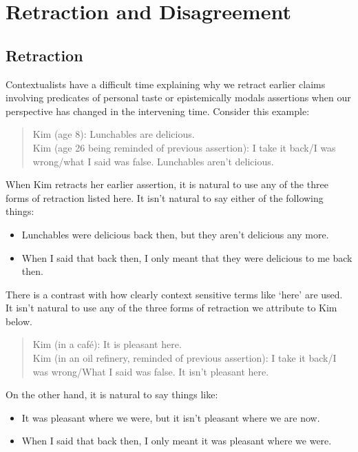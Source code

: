\documentclass[
  10pt,
  letterpaper,
  DIV=11,
  numbers=noendperiod,
  twoside]{scrartcl}
\providecommand{\tightlist}{%
  \setlength{\itemsep}{0pt}\setlength{\parskip}{0pt}}\usepackage{longtable,booktabs,array}
\begin{document}
\section{Retraction and Disagreement}\label{retractionanddisagreement}

\subsection{Retraction}\label{retraction}

Contextualists have a difficult time explaining why we retract earlier
claims involving predicates of personal taste or epistemically modals
assertions when our perspective has changed in the intervening time.
Consider this example:

\begin{quote}
Kim (age 8): Lunchables are delicious.\\
Kim (age 26 being reminded of previous assertion): I take it back/I was
wrong/what I said was false. Lunchables aren't delicious.
\end{quote}

When Kim retracts her earlier assertion, it is natural to use any of the
three forms of retraction listed here. It isn't natural to say either of
the following things:

\begin{itemize}
\tightlist
\item
  Lunchables were delicious back then, but they aren't delicious any
  more.
\item
  When I said that back then, I only meant that they were delicious to
  me back then.
\end{itemize}

There is a contrast with how clearly context sensitive terms like `here'
are used. It isn't natural to use any of the three forms of retraction
we attribute to Kim below.

\begin{quote}
Kim (in a café): It is pleasant here.\\
Kim (in an oil refinery, reminded of previous assertion): I take it
back/I was wrong/What I said was false. It isn't pleasant here.
\end{quote}

On the other hand, it is natural to say things like:

\begin{itemize}
\tightlist
\item
  It was pleasant where we were, but it isn't pleasant where we are now.
\item
  When I said that back then, I only meant it was pleasant where we
  were.
\end{itemize}
\end{document}
